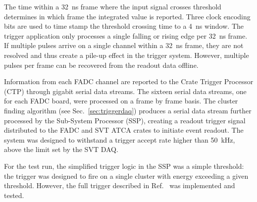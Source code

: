 The time within a 32~ns frame where the input signal crosses threshold determines in which frame the 
integrated value is reported. Three clock encoding bits are used to time stamp the threshold crossing time to 
a 4~ns window.  
The trigger application only processes a single falling or rising edge per 32~ns frame. If multiple 
pulses arrive on a single channel within a 32~ns frame, they are not resolved and thus create a pile-up 
effect in the trigger system. However, multiple pulses per frame can be recovered from the readout data offline.

Information from each FADC channel are reported to the Crate Trigger Processor (CTP) through gigabit 
serial data streams. The sixteen serial data streams, one for each FADC board, were processed on a frame 
by frame basis. The cluster finding algorithm (see Sec.~\ref{sec:triggerdaq}) produces a serial data 
stream further processed by the Sub-System Processor (SSP), creating a readout trigger signal 
distributed to the FADC and SVT ATCA crates to initiate event readout. The system was designed to withstand 
a trigger accept rate higher than 50~kHz, above the limit set by the SVT DAQ.  

For the test run, the simplified trigger logic in the SSP was a simple threshold: the trigger was designed 
to fire on a single cluster with energy exceeding a given threshold. However, the full trigger described in 
Ref.~\cite{HPS_tPROP} was implemented and tested.
